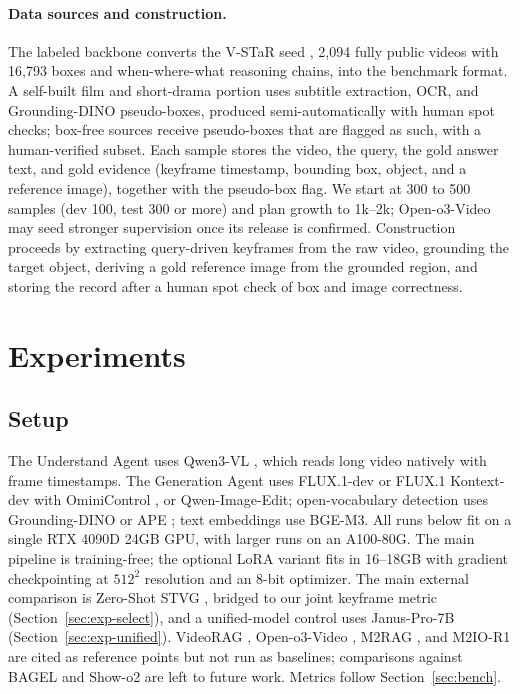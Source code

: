\paragraph{Data sources and construction.}
The labeled backbone converts the V-STaR seed \citep{vstar2503}, 2{,}094 fully public videos with 16{,}793 boxes and when-where-what reasoning chains, into the benchmark format. A self-built film and short-drama portion uses subtitle extraction, OCR, and Grounding-DINO pseudo-boxes, produced semi-automatically with human spot checks; box-free sources receive pseudo-boxes that are flagged as such, with a human-verified subset. Each sample stores the video, the query, the gold answer text, and gold evidence (keyframe timestamp, bounding box, object, and a reference image), together with the pseudo-box flag. We start at 300 to 500 samples (dev 100, test 300 or more) and plan growth to 1k--2k; Open-o3-Video \citep{openo3video2510} may seed stronger supervision once its release is confirmed. Construction proceeds by extracting query-driven keyframes from the raw video, grounding the target object, deriving a gold reference image from the grounded region, and storing the record after a human spot check of box and image correctness.

\section{Experiments}\label{sec:exp}

\subsection{Setup}\label{sec:exp-setup}

The Understand Agent uses Qwen3-VL \citep{qwen3vl2511}, which reads long video natively with frame timestamps. The Generation Agent uses FLUX.1-dev or FLUX.1 Kontext-dev with OminiControl \citep{ominicontrol2411}, or Qwen-Image-Edit; open-vocabulary detection uses Grounding-DINO or APE \citep{videorag2411}; text embeddings use BGE-M3. All runs below fit on a single RTX 4090D 24GB GPU, with larger runs on an A100-80G. The main pipeline is training-free; the optional LoRA variant fits in 16--18GB with gradient checkpointing at $512^2$ resolution and an 8-bit optimizer. The main external comparison is Zero-Shot STVG \citep{zeroshotstvg2509}, bridged to our joint keyframe metric (Section~\ref{sec:exp-select}), and a unified-model control uses Janus-Pro-7B \citep{januspro2501} (Section~\ref{sec:exp-unified}). VideoRAG \citep{videorag2502}, Open-o3-Video \citep{openo3video2510}, M2RAG \citep{m2rag2411}, and M2IO-R1 \citep{m2ior12508} are cited as reference points but not run as baselines; comparisons against BAGEL \citep{bagel2505} and Show-o2 \citep{showo22506} are left to future work. Metrics follow Section~\ref{sec:bench}.

